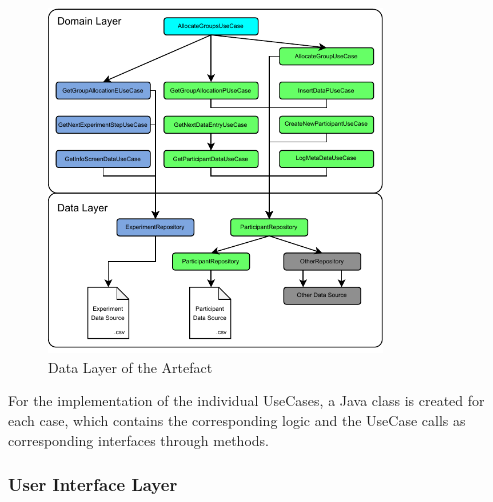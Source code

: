\begin{figure}[htbp]
    \centering
    \includegraphics[width=0.79\textwidth, keepaspectratio]{content/05_design_and_dev_artefacts/DomainLayer.drawio.pdf}
    \caption{Data Layer of the Artefact}    
    \label{fig:domainLayer}
\end{figure}

For the implementation of the individual UseCases, a Java class is created for each case, which contains the corresponding logic and the UseCase calls as corresponding interfaces through methods.







\subsubsection{User Interface Layer}

